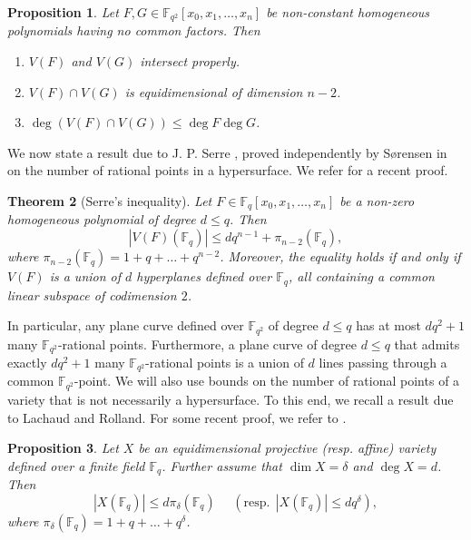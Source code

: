\documentclass[10pt,a4paper,oneside]{amsproc}
\newtheorem{theorem}{Theorem}[section]
\newtheorem{proposition}[theorem]{Proposition}
\newcommand{\Fqt}{\mathbb{F}_{q^2}}
\newcommand{\Fq}{\mathbb{F}_q}
\def\Fq{{\mathbb F}_q}
\def\FF{{\mathbb F}}
\begin{document}
\begin{proposition}\cite[Proposition 2.13]{S1}\label{coprime}
Let $F, G \in \Fqt[x_0, x_1, \dots, x_n]$ be non-constant homogeneous polynomials having no common factors. Then 
\begin{enumerate}
\item[(a)] $V(F)$ and $V(G)$ intersect properly. 
\item[(b)] $V(F) \cap V(G)$ is equidimensional of dimension $n-2$.
\item[(c)] $\deg \left(V(F) \cap V(G)\right) \le \deg F \deg G$. 
\end{enumerate}
\end{proposition}





We now state a result due to J. P. Serre \cite{S}, proved independently by S{\o}rensen in \cite{So} on the number of rational points in a hypersurface. We refer \cite{GL} for a recent proof.
\begin{theorem}[Serre's inequality]\label{serre}
Let $ F \in \Fq[x_0, x_1, \dots, x_n]$ be a non-zero homogeneous polynomial of degree $d \le q$. Then 
$$|V(F)(\FF_q)| \le dq^{n-1} + \pi_{n-2}(\Fq),$$
where $\pi_{n-2}(\Fq) = 1 + q + \dots + q^{n-2}$. Moreover, the
equality holds if and only if $V(F)$ is a union of $d$ hyperplanes defined over $\Fq$, all containing a common linear subspace of codimension $2$. 
\end{theorem}

 In particular, any plane curve defined over $\Fqt$ of degree $d \leq q$ has at most $dq^2+1$ many $\Fqt$-rational points. Furthermore, a plane curve of degree $d\leq q$ that admits exactly $dq^2+1$ many $\Fqt$-rational points is a union of $d$ lines passing through a common $\Fqt$-point. We will also use bounds on the number of rational points of a variety that is not necessarily a hypersurface. To this end, we recall a result due to Lachaud and Rolland. For some recent proof, we refer to \cite{DG1}.


\begin{proposition}\cite[Prop. 2.3]{LR}\label{lac}
Let $X$ be an equidimensional projective (resp. affine) variety defined over a finite field $\Fq$. Further assume that $\dim X = \delta$ and $\deg X = d$.  Then
$$|X(\Fq)| \le d \pi_{\delta}(\Fq) \ \ \ \ \ \ (\mathrm{resp.} \ \  |X (\Fq)| \le d q^{\delta}),$$
where $\pi_{\delta}(\Fq) = 1 + q + \dots + q^{\delta}$.
\end{proposition}
\end{document}
